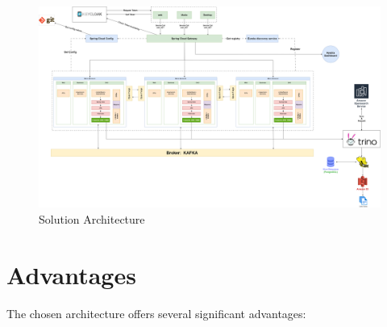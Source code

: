 \begin{figure}[H]
\centering
\includegraphics[width=\linewidth]{images/architecture-solution.png}
\caption{Solution Architecture}\label{fig:solution}
\end{figure}

\section{Advantages}

The chosen architecture offers several significant advantages:

